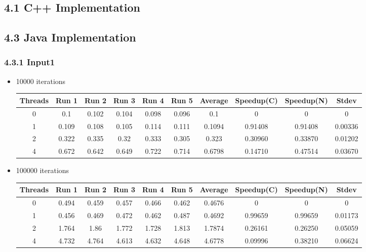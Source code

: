 \subsection*{4.1 C++ Implementation}



\subsection*{4.3 Java Implementation}
\subsubsection*{4.3.1 Input1} 
 \begin{itemize}
\item 10000 iterations
\begin{center}
 \begin{adjustbox}{width=\columnwidth, center} 
 \begin{tabular}{ | |c | c c c c c | c | c c | c | |} \hline 
 Threads & Run 1 & Run 2 & Run 3 & Run 4 & Run 5 & Average & Speedup(C) & Speedup(N) & Stdev \\ [0.5ex] 
 \hline 
 \hline 
0& 0.1 & 0.102 & 0.104 & 0.098 & 0.096 & 0.1 & 0 & 0 & 0\\ 
 \hline
1& 0.109 & 0.108 & 0.105 & 0.114 & 0.111 & 0.1094 & 0.91408 & 0.91408 & 0.00336\\ 
 \hline
2& 0.322 & 0.335 & 0.32 & 0.333 & 0.305 & 0.323 & 0.30960 & 0.33870 & 0.01202\\ 
 \hline
4& 0.672 & 0.642 & 0.649 & 0.722 & 0.714 & 0.6798 & 0.14710 & 0.47514 & 0.03670\\ 
 \hline
\end{tabular} 
 \end{adjustbox} 
 \end{center} 
\item 100000 iterations
\begin{center}
 \begin{adjustbox}{width=\columnwidth, center} 
 \begin{tabular}{ | |c | c c c c c | c | c c | c | |} \hline 
 Threads & Run 1 & Run 2 & Run 3 & Run 4 & Run 5 & Average & Speedup(C) & Speedup(N) & Stdev \\ [0.5ex] 
 \hline 
 \hline 
0& 0.494 & 0.459 & 0.457 & 0.466 & 0.462 & 0.4676 & 0 & 0 & 0\\ 
 \hline
1& 0.456 & 0.469 & 0.472 & 0.462 & 0.487 & 0.4692 & 0.99659 & 0.99659 & 0.01173\\ 
 \hline
2& 1.764 & 1.86 & 1.772 & 1.728 & 1.813 & 1.7874 & 0.26161 & 0.26250 & 0.05059\\ 
 \hline
4& 4.732 & 4.764 & 4.613 & 4.632 & 4.648 & 4.6778 & 0.09996 & 0.38210 & 0.06624\\ 
 \hline
\end{tabular} 
 \end{adjustbox} 
 \end{center} 
\end{itemize}
